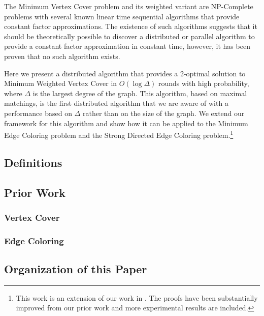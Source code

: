 \documentclass[twoside]{article}
\begin{document}
The Minimum Vertex Cover problem and its weighted variant are NP-Complete problems with several known linear time sequential algorithms that provide constant factor approximations. The existence of such algorithms suggests that it should be theoretically possible to discover a distributed or parallel algorithm to provide a constant factor approximation in constant time, however, it has been proven that no such algorithm exists\cite{1011811}. 

Here we present a distributed algorithm that provides a 2-optimal solution to Minimum Weighted Vertex Cover in $O(\log\Delta)$ rounds with high probability, where $\Delta$ is the largest degree of the graph. This algorithm, based on maximal matchings, is the first distributed algorithm that we are aware of with a performance based on $\Delta$ rather than on the size of the graph. We extend our framework for this algorithm and show how it can be applied to the Minimum Edge Coloring problem and the Strong Directed Edge Coloring problem.\footnote{This work is an extension of our work in \cite{Daigle:2011uq, Daigle:2012uq}. The proofs have been substantially improved from our prior work and more experimental results are included.}

\subsection{Definitions}





\subsection{Prior Work}
\subsubsection{Vertex Cover}



\subsubsection{Edge Coloring}



\subsection{Organization of this Paper}
\end{document}
